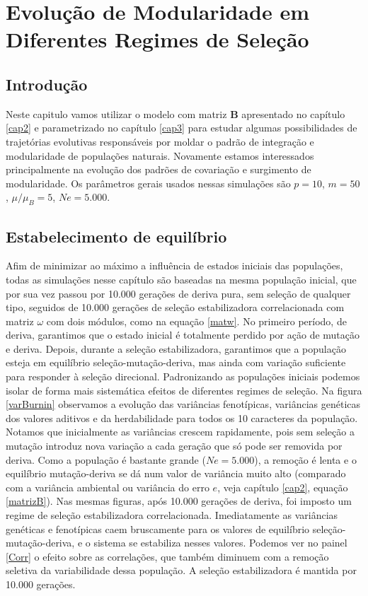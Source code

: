 \pagestyle{empty}
\cleardoublepage
\pagestyle{fancy}
\chapter{Evolução de Modularidade em Diferentes Regimes de
Seleção}\label{cap4}

\section{Introdução}

Neste capitulo vamos utilizar o modelo com matriz $\mathbf{B}$ apresentado no
capítulo \ref{cap2} e parametrizado no capítulo \ref{cap3} para estudar
algumas possibilidades de trajetórias evolutivas responsáveis por moldar
o padrão de integração e modularidade de populações naturais. 
Novamente estamos interessados principalmente na evolução dos padrões de
covariação e surgimento de modularidade. 
Os parâmetros gerais usados nessas simulações são $p = 10$, $m = 50$,
$\mu/\mu_B = 5$, $Ne = 5.000$. 

\section{Estabelecimento de equilíbrio}

Afim de minimizar ao máximo a influência de estados iniciais das
populações, todas as simulações nesse capítulo são baseadas na mesma
população inicial, que por sua vez passou por 10.000 gerações de deriva
pura, sem seleção de qualquer tipo, seguidos de 10.000 gerações de
seleção estabilizadora correlacionada com matriz $\omega$ com dois
módulos, como na equação \ref{matw}. 
No primeiro período, de deriva, garantimos que o estado inicial é
totalmente perdido por ação de mutação e deriva. 
Depois, durante a seleção estabilizadora, garantimos que a população
esteja em equilíbrio seleção-mutação-deriva, mas ainda com variação
suficiente para responder à seleção direcional. 
Padronizando as populações iniciais podemos isolar de forma mais
sistemática efeitos de diferentes regimes de seleção. 
Na figura \ref{varBurnin} observamos a evolução das variâncias
fenotípicas, variâncias genéticas dos valores aditivos e da
herdabilidade para todos os 10 caracteres da população. 
Notamos que inicialmente as variâncias crescem rapidamente, pois sem
seleção a mutação introduz nova variação a cada geração que só pode ser
removida por deriva. 
Como a população é bastante grande ($Ne = 5.000$), a remoção é lenta e o
equilíbrio mutação-deriva se dá num valor de variância muito alto
(comparado com a variância ambiental ou variância do erro $e$, veja
capítulo \ref{cap2}, equação \ref{matrizB}). 
Nas mesmas figuras, após 10.000 gerações de deriva, foi imposto um regime de
seleção estabilizadora correlacionada. 
Imediatamente as variâncias genéticas e fenotípicas caem bruscamente
para os valores de equilíbrio seleção-mutação-deriva, e o sistema se
estabiliza nesses valores. 
Podemos ver no painel \ref{Corr} o efeito sobre as correlações,
que também diminuem com a remoção seletiva da variabilidade dessa
população. 
A seleção estabilizadora é mantida por 10.000 gerações. 


